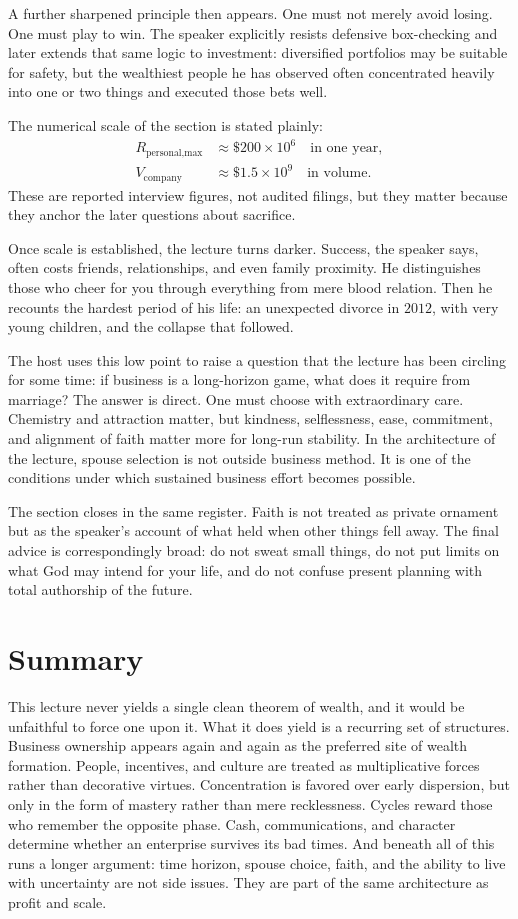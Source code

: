 A further sharpened principle then appears. One must not merely avoid losing. One must play to win. The speaker explicitly resists defensive box-checking and later extends that same logic to investment: diversified portfolios may be suitable for safety, but the wealthiest people he has observed often concentrated heavily into one or two things and executed those bets well.

The numerical scale of the section is stated plainly:
\begin{align}
R_{\text{personal,max}} &\approx \$200\times 10^6 \quad \text{in one year},\\
V_{\text{company}} &\approx \$1.5\times 10^9 \quad \text{in volume}.
\end{align}
These are reported interview figures, not audited filings, but they matter because they anchor the later questions about sacrifice.

Once scale is established, the lecture turns darker. Success, the speaker says, often costs friends, relationships, and even family proximity. He distinguishes those who cheer for you through everything from mere blood relation. Then he recounts the hardest period of his life: an unexpected divorce in \(2012\), with very young children, and the collapse that followed.

The host uses this low point to raise a question that the lecture has been circling for some time: if business is a long-horizon game, what does it require from marriage? The answer is direct. One must choose with extraordinary care. Chemistry and attraction matter, but kindness, selflessness, ease, commitment, and alignment of faith matter more for long-run stability. In the architecture of the lecture, spouse selection is not outside business method. It is one of the conditions under which sustained business effort becomes possible.

The section closes in the same register. Faith is not treated as private ornament but as the speaker's account of what held when other things fell away. The final advice is correspondingly broad: do not sweat small things, do not put limits on what God may intend for your life, and do not confuse present planning with total authorship of the future.

\section{Summary}

This lecture never yields a single clean theorem of wealth, and it would be unfaithful to force one upon it. What it does yield is a recurring set of structures. Business ownership appears again and again as the preferred site of wealth formation. People, incentives, and culture are treated as multiplicative forces rather than decorative virtues. Concentration is favored over early dispersion, but only in the form of mastery rather than mere recklessness. Cycles reward those who remember the opposite phase. Cash, communications, and character determine whether an enterprise survives its bad times. And beneath all of this runs a longer argument: time horizon, spouse choice, faith, and the ability to live with uncertainty are not side issues. They are part of the same architecture as profit and scale.

